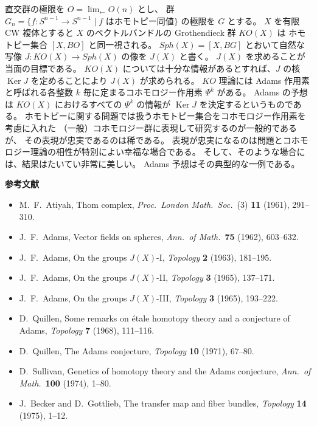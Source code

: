 \documentclass[uplatex,dvipdfmx]{jlreq}
\begin{document}
直交群の極限を $O = \displaystyle\lim_{\leftarrow} O(n)$ とし、
群 $G_n = \{f : S^{n-1} \to S^{n-1} \mid f \text{ はホモトピー同値}\}$ の極限を $G$ とする。
$X$ を有限 CW 複体とすると $X$ のベクトルバンドルの Grothendieck 群 $KO(X)$ は
ホモトピー集合 $[X, BO]$ と同一視される。
$\mathit{Sph}(X) = [X, BG]$ とおいて自然な写像 $J : KO(X) \to \mathit{Sph}(X)$ の像を $J(X)$ と書く。
$J(X)$ を求めることが当面の目標である。
$KO(X)$ については十分な情報があるとすれば、$J$ の核 $\operatorname{Ker} J$ を定めることにより
$J(X)$ が求められる。
$KO$ 理論には Adams 作用素と呼ばれる各整数 $k$ 毎に定まるコホモロジー作用素 $\Psi^k$ がある。
Adams の予想は $KO(X)$ におけるすべての $\Psi^k$ の情報が $\operatorname{Ker} J$ を決定するというものである。
ホモトピーに関する問題では扱うホモトピー集合をコホモロジー作用素を考慮に入れた
（一般）コホモロジー群に表現して研究するのが一般的であるが、
その表現が忠実であるのは稀である。
表現が忠実になるのは問題とコホモロジー理論の相性が特別によい幸福な場合である。
そして、そのような場合には、結果はたいてい非常に美しい。
Adams 予想はその典型的な一例である。

\medskip
\begin{center}
  \textbf{参考文献}
\end{center}

\begin{itemize}
  \setlength{\itemsep}{2pt}
  \item[{[At61]}] M.~F.~Atiyah,
        Thom complex,
        \textit{Proc.\ London Math.\ Soc.}\ (3) \textbf{11} (1961), 291--310.
  \item[{[Ad62]}] J.~F.~Adams,
        Vector fields on spheres,
        \textit{Ann.\ of Math.}\ \textbf{75} (1962), 603--632.
  \item[{[Ad63]}] J.~F.~Adams,
        On the groups $J(X)$-I,
        \textit{Topology} \textbf{2} (1963), 181--195.
  \item[{[Ad65a]}] J.~F.~Adams,
        On the groups $J(X)$-II,
        \textit{Topology} \textbf{3} (1965), 137--171.
  \item[{[Ad65b]}] J.~F.~Adams,
        On the groups $J(X)$-III,
        \textit{Topology} \textbf{3} (1965), 193--222.
  \item[{[Q68]}] D.~Quillen,
        Some remarks on étale homotopy theory and a conjecture of Adams,
        \textit{Topology} \textbf{7} (1968), 111--116.
  \item[{[Q71]}] D.~Quillen,
        The Adams conjecture,
        \textit{Topology} \textbf{10} (1971), 67--80.
  \item[{[S74]}] D.~Sullivan,
        Genetics of homotopy theory and the Adams conjecture,
        \textit{Ann.\ of Math.}\ \textbf{100} (1974), 1--80.
  \item[{[BG75]}] J.~Becker and D.~Gottlieb,
        The transfer map and fiber bundles,
        \textit{Topology} \textbf{14} (1975), 1--12.
\end{itemize}
\end{document}
